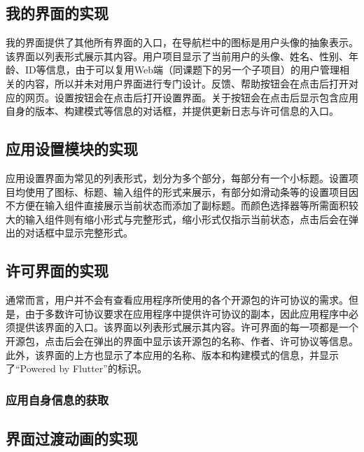 \subsection{我的界面的实现}\label{subsec:me-ui}

我的界面提供了其他所有界面的入口，在导航栏中的图标是用户头像的抽象表示。该界面以列表形式展示其内容。用户项目显示了当前用户的头像、姓名、性别、年龄、ID等信息，由于可以复用Web端（同课题下的另一个子项目）的用户管理相关的内容，所以并未对用户界面进行专门设计。反馈、帮助按钮会在点击后打开对应的网页。设置按钮会在点击后打开设置界面。关于按钮会在点击后显示包含应用自身的版本、构建模式等信息的对话框，并提供更新日志与许可信息的入口。

\subsection{应用设置模块的实现}\label{subsec:settings}

应用设置界面为常见的列表形式，划分为多个部分，每部分有一个小标题。设置项目均使用了图标、标题、输入组件的形式来展示，有部分如滑动条等的设置项目因不方便在输入组件直接展示当前状态而添加了副标题。而颜色选择器等所需面积较大的输入组件则有缩小形式与完整形式，缩小形式仅指示当前状态，点击后会在弹出的对话框中显示完整形式。


\subsection{许可界面的实现}\label{subsec:license-ui}

通常而言，用户并不会有查看应用程序所使用的各个开源包的许可协议的需求。但是，由于多数许可协议要求在应用程序中提供许可协议的副本，因此应用程序中必须提供该界面的入口。该界面以列表形式展示其内容。许可界面的每一项都是一个开源包，点击后会在弹出的界面中显示该开源包的名称、作者、许可协议等信息。此外，该界面的上方也显示了本应用的名称、版本和构建模式的信息，并显示了“Powered by Flutter”的标识。

\subsubsection{应用自身信息的获取}\label{subsubsec:app-info}


\subsection{界面过渡动画的实现}\label{subsec:transition-ui}

